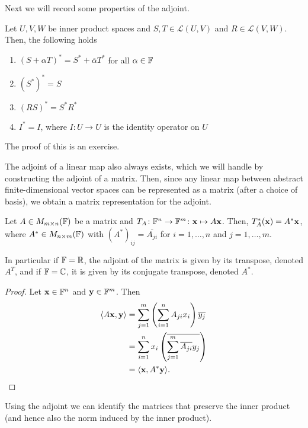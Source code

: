 \documentclass{article}
\begin{document}
Next we will record some properties of the adjoint.

\begin{proposition}
Let $U,V,W$ be inner product spaces and $S,T \in \mathcal{L}(U,V)$ and $R\in \mathcal{L}(V,W)$. Then, the following holds
\begin{enumerate}
    \item $(S+\alpha T)^* = S^* + \overline{\alpha}T^*$ for all $\alpha\in {\mathbb{F}}$
    \item $(S^*)^* = S$
    \item $(RS)^* = S^*R^*$
    \item $I^* = I$, where $I \colon U \to U$ is the identity operator on $U$
\end{enumerate}
\end{proposition}

The proof of this is an exercise. 

The adjoint of a linear map also always exists, which we will handle by constructing the adjoint of a matrix. Then, since any linear map between abstract finite-dimensional vector spaces can be represented as a matrix (after a choice of basis), we obtain a matrix representation for the adjoint.  %

\begin{proposition}
Let $A\in M_{m\times n}({\mathbb{F}})$ be a matrix and $T_A\colon {\mathbb{F}}^n\to {\mathbb{F}}^m \colon {\mathbf{x}} \mapsto A{\mathbf{x}}$. Then, $T_A^*({\mathbf{x}}) = A^* {\mathbf{x}} $, where $A^*\in M_{n\times m}({\mathbb{F}})$ with $(A^*)_{ij} = \overline{A_{ji}}$ for $i=1,\ldots,n$ and $j=1,\ldots,m$. 

In particular if ${\mathbb{F}} = {\mathbb{R}}$, the adjoint of the matrix is given by its transpose, denoted $A^T$, and if ${\mathbb{F}} = {\mathbb{C}}$, it is given by its conjugate transpose, denoted $A^*$.
\end{proposition}

\begin{proof}
Let ${\mathbf{x}}\in {\mathbb{F}}^n$ and ${\mathbf{y}} \in {\mathbb{F}}^m$. Then
\begin{align*}
    \langle A{\mathbf{x}}, {\mathbf{y}} \rangle &= \sum_{j=1}^m \left(\sum_{i=1}^n A_{ji} x_i\right) \overline{y_j} \\
    &=\sum_{i=1}^n x_i \left( \overline{\sum_{j=1}^m \overline{A_{ji}} y_j}\right)\\
    &=\langle {\mathbf{x}}, A^* {\mathbf{y}} \rangle.
\end{align*}
\end{proof}

Using the adjoint we can identify the matrices that preserve the inner product (and hence also the norm induced by the inner product).
\end{document}
